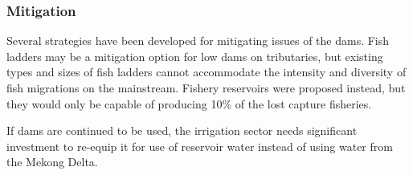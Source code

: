\subsubsection{Mitigation}
Several strategies have been developed for mitigating issues of the dams. Fish ladders may be a mitigation option for low dams on tributaries, but existing types and sizes of fish ladders cannot accommodate the intensity and diversity of fish migrations on the mainstream. Fishery reservoirs were proposed instead, but they would only be capable of producing 10\% of the lost capture fisheries.

If dams are continued to be used, the irrigation sector needs significant investment to re-equip it for use of reservoir water instead of using water from the Mekong Delta.